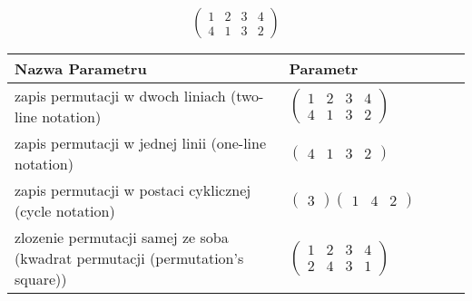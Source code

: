 \documentclass[12pt]{article}
\begin{document}
\subsection{}
\begin{center}
\[
\begin{pmatrix}
	1 & 2 & 3 & 4 \\ 
	4 & 1 & 3 & 2 
\end{pmatrix}
\]

\begin{tabular}{|m{0.6\linewidth}|m{0.4\linewidth}|}
	\hline
	Nazwa Parametru & Parametr \\
	\hline
	zapis permutacji w dwoch liniach (two-line notation) & $\begin{pmatrix} 1 & 2 & 3 & 4 \\ 
4 & 1 & 3 & 2 \end{pmatrix}$ \\ 
	\hline
	zapis permutacji w jednej linii (one-line notation) & $\begin{pmatrix} 4 & 1 & 3 & 2 \end{pmatrix}$ \\ 
	\hline
	zapis permutacji w postaci cyklicznej (cycle notation) & $\begin{pmatrix} 3 \end{pmatrix} \begin{pmatrix} 1 & 4 & 2 \end{pmatrix} $ \\ 
	\hline
	zlozenie permutacji samej ze soba (kwadrat permutacji (permutation's square)) & $\begin{pmatrix} 1 & 2 & 3 & 4 \\ 
2 & 4 & 3 & 1 \end{pmatrix}$ \\ 
	\hline
\end{tabular}
\end{center}
\end{document}
